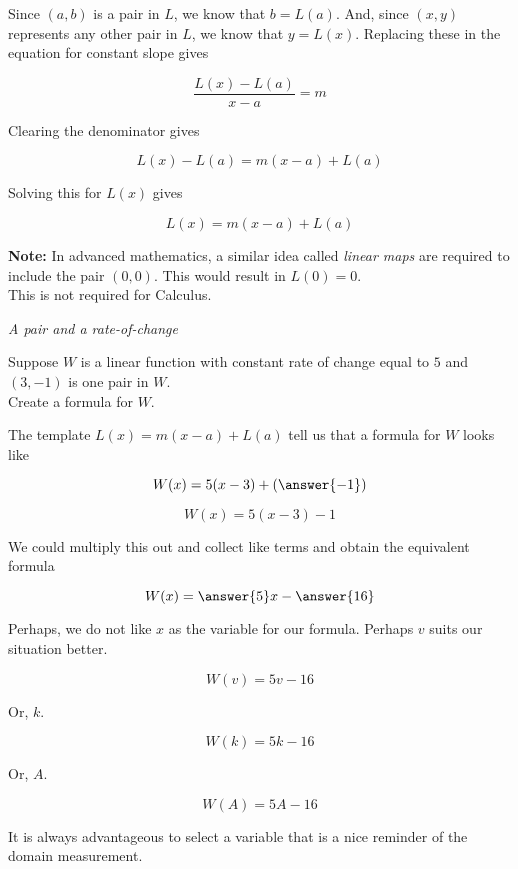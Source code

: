 \documentclass{ximera}
\begin{document}
Since $(a, b)$ is a pair in $L$, we know that $b = L(a)$.  And, since $(x, y)$ represents any other pair in $L$, we know that $y = L(x)$.  Replacing these in the equation for constant slope gives


\[  \frac{L(x) - L(a)}{x-a} = m \]


Clearing the denominator gives


\[  L(x) - L(a) = m (x-a) + L(a)     \]

Solving this for $L(x)$ gives

\[  L(x) = m (x-a) + L(a)     \]



\textbf{Note:} In advanced mathematics, a similar idea called \textit{linear maps} are required to include the pair $(0,0)$.  This would result in $L(0) = 0$. \\  
This is not required for Calculus. \\




\begin{example} \textit{A pair and a rate-of-change}


Suppose $W$ is a linear function with constant rate of change equal to $5$ and $(3, -1)$ is one pair in $W$.  \\

Create a formula for $W$.

\begin{explanation}

The template $L(x) = m (x-a) + L(a)$ tell us that a formula for $W$ looks like 


\[  W(x) = 5 (x-3) + \left(\answer{-1}\right)     \]


\[  W(x) = 5 (x-3) - 1     \]

We could multiply this out and collect like terms and obtain the equivalent formula


\[  W(x) = \answer{5}x - \answer{16}   \]

\end{explanation}

Perhaps, we do not like $x$ as the variable for our formula.  Perhaps $v$ suits our situation better.

\[  W(v) = 5v - 16   \]


Or, $k$.

\[  W(k) = 5k - 16   \]


Or, $A$.

\[  W(A) = 5A - 16   \]


It is always advantageous to select a variable that is a nice reminder of the domain measurement.

\end{example}
\end{document}
